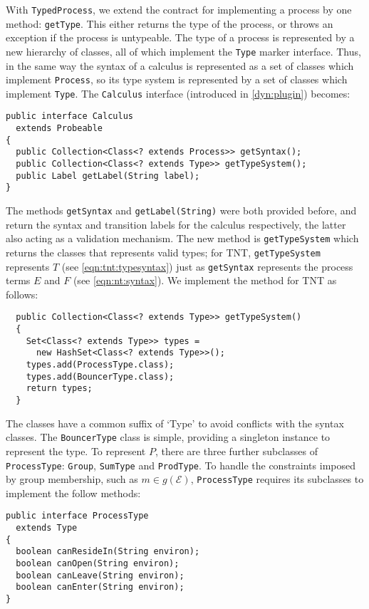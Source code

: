With \texttt{TypedProcess}, we extend the contract for implementing a
process by one method: \texttt{getType}.  This either returns the type
of the process, or throws an exception if the process is untypeable.
The type of a process is represented by a new hierarchy of classes,
all of which implement the \texttt{Type} marker interface.  Thus, in
the same way the syntax of a calculus is represented as a set of
classes which implement \texttt{Process}, so its type system is
represented by a set of classes which implement \texttt{Type}.  The
\texttt{Calculus} interface (introduced in \ref{dyn:plugin}) becomes:

\begin{verbatim}
public interface Calculus
  extends Probeable
{
  public Collection<Class<? extends Process>> getSyntax();
  public Collection<Class<? extends Type>> getTypeSystem();
  public Label getLabel(String label);
}
\end{verbatim}

The methods \texttt{getSyntax} and \texttt{getLabel(String)} were both
provided before, and return the syntax and transition labels for the
calculus respectively, the latter also acting as a validation
mechanism.  The new method is \texttt{getTypeSystem} which returns the
classes that represents valid types; for TNT, \texttt{getTypeSystem}
represents $T$ (see \ref{eqn:tnt:typesyntax}) just as
\texttt{getSyntax} represents the process terms $E$ and $F$ (see
\ref{eqn:nt:syntax}).  We implement the method for TNT as follows:

\begin{verbatim}
  public Collection<Class<? extends Type>> getTypeSystem()
  {
    Set<Class<? extends Type>> types =
      new HashSet<Class<? extends Type>>();
    types.add(ProcessType.class);
    types.add(BouncerType.class);
    return types;
  }
\end{verbatim}

The classes have a common suffix of `Type' to avoid conflicts with the
syntax classes.  The \texttt{BouncerType} class is simple, providing a
singleton instance to represent the type.  To represent $P$, there are
three further subclasses of \texttt{ProcessType}: \texttt{Group},
\texttt{SumType} and \texttt{ProdType}.  To handle the constraints
imposed by group membership, such as $m \in g(\mathscr{E})$,
\texttt{ProcessType} requires its subclasses to implement the follow
methods:

\begin{verbatim}
public interface ProcessType
  extends Type
{
  boolean canResideIn(String environ);
  boolean canOpen(String environ);
  boolean canLeave(String environ);
  boolean canEnter(String environ);
}
\end{verbatim}

